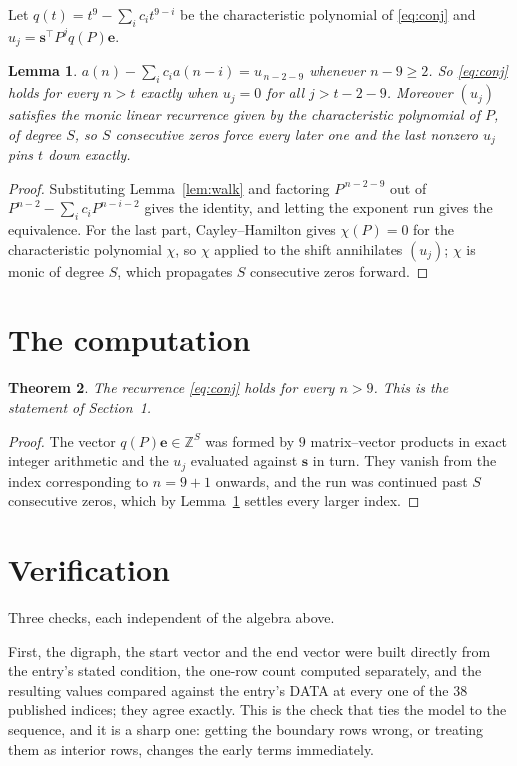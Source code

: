 \documentclass[11pt,a4paper]{article}
\theoremstyle{plain}
\newtheorem{theorem}{Theorem}
\newtheorem{lemma}[theorem]{Lemma}
\theoremstyle{definition}
\begin{document}
Let $q(t)=t^{9}-\sum_i c_i t^{9-i}$ be the characteristic polynomial of
\eqref{eq:conj} and $u_j=\mathbf{s}^{\!\top}P^{j}q(P)\mathbf{e}$.

\begin{lemma}\label{lem:crit}
$a(n)-\sum_i c_i a(n-i)=u_{\,n-2-9}$ whenever $n-9\ge2$. So \eqref{eq:conj}
holds for every $n>t$ exactly when $u_j=0$ for all $j>t-2-9$. Moreover $(u_j)$
satisfies the monic linear recurrence given by the characteristic polynomial of $P$, of
degree $S$, so $S$ consecutive zeros force every later one and the last nonzero $u_j$ pins
$t$ down exactly.
\end{lemma}

\begin{proof}
Substituting Lemma~\ref{lem:walk} and factoring $P^{\,n-2-9}$ out of
$P^{n-2}-\sum_i c_i P^{n-i-2}$ gives the identity, and letting the exponent run gives the
equivalence. For the last part, Cayley--Hamilton gives $\chi(P)=0$ for the characteristic
polynomial $\chi$, so $\chi$ applied to the shift annihilates $(u_j)$; $\chi$ is monic of
degree $S$, which propagates $S$ consecutive zeros forward.
\end{proof}

\section{The computation}

\begin{theorem}
The recurrence \eqref{eq:conj} holds for every $n>9$. This is the statement of
Section~1.
\end{theorem}

\begin{proof}
The vector $q(P)\mathbf{e}\in\mathbb{Z}^{S}$ was formed by $9$ matrix--vector
products in exact integer arithmetic and the $u_j$ evaluated against $\mathbf{s}$ in turn.
They vanish from the index corresponding to $n=9+1$ onwards, and the run was continued
past $S$ consecutive zeros, which by Lemma~\ref{lem:crit} settles every larger index.
\end{proof}

\section{Verification}

Three checks, each independent of the algebra above.

First, the digraph, the start vector and the end vector were built directly from the
entry's stated condition, the one-row count computed separately, and the resulting values
compared against the entry's DATA at every one of the $38$ published indices; they
agree exactly. This is the check that ties the model to the sequence, and it is a sharp one:
getting the boundary rows wrong, or treating them as interior rows, changes the early terms
immediately.
\end{document}
